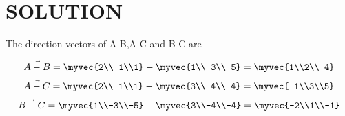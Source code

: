 \documentclass[journal,12pt,twocolumn]{IEEEtran}
\begin{document}
\section{SOLUTION}
The direction vectors of A-B,A-C and B-C are 
\item 
\begin{align}
\vec{A-B}=\myvec{2\\-1\\1}-\myvec{1\\-3\\-5}=\myvec{1\\2\\-4}
\end{align}
\begin{align}
\vec{A-C }=\myvec{2\\-1\\1}-\myvec{3\\-4\\-4}=\myvec{-1\\3\\5}
\end{align}
\begin{align}
\vec{B-C}=\myvec{1\\-3\\-5}-\myvec{3\\-4\\-4}=\myvec{-2\\1\\-1}
\end{align}
\end{document}

